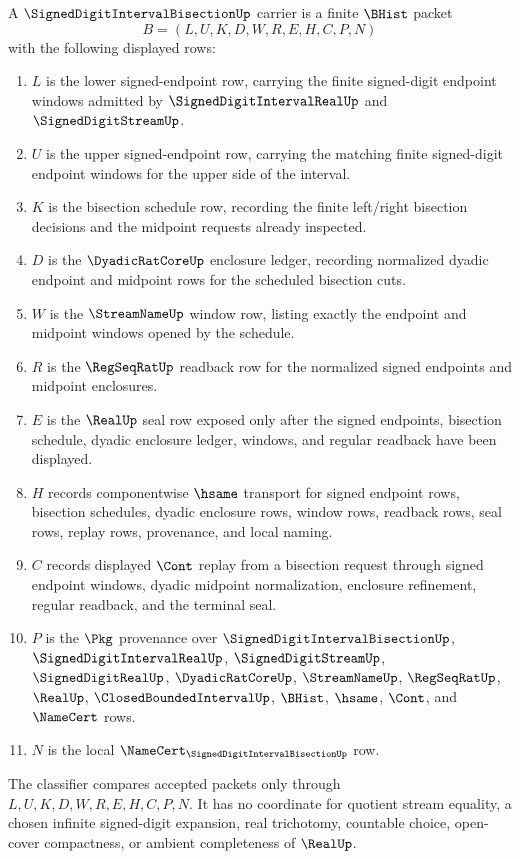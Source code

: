 \begin{definition}
\label{def:signed-digit-interval-bisection-carrier}
A $\SignedDigitIntervalBisectionUp$ carrier is a finite $\BHist$ packet
$$
B=(L,U,K,D,W,R,E,H,C,P,N)
$$
with the following displayed rows:
\begin{enumerate}
\item $L$ is the lower signed-endpoint row, carrying the finite signed-digit endpoint windows admitted by $\SignedDigitIntervalRealUp$ and $\SignedDigitStreamUp$.
\item $U$ is the upper signed-endpoint row, carrying the matching finite signed-digit endpoint windows for the upper side of the interval.
\item $K$ is the bisection schedule row, recording the finite left/right bisection decisions and the midpoint requests already inspected.
\item $D$ is the $\DyadicRatCoreUp$ enclosure ledger, recording normalized dyadic endpoint and midpoint rows for the scheduled bisection cuts.
\item $W$ is the $\StreamNameUp$ window row, listing exactly the endpoint and midpoint windows opened by the schedule.
\item $R$ is the $\RegSeqRatUp$ readback row for the normalized signed endpoints and midpoint enclosures.
\item $E$ is the $\RealUp$ seal row exposed only after the signed endpoints, bisection schedule, dyadic enclosure ledger, windows, and regular readback have been displayed.
\item $H$ records componentwise $\hsame$ transport for signed endpoint rows, bisection schedules, dyadic enclosure rows, window rows, readback rows, seal rows, replay rows, provenance, and local naming.
\item $C$ records displayed $\Cont$ replay from a bisection request through signed endpoint windows, dyadic midpoint normalization, enclosure refinement, regular readback, and the terminal seal.
\item $P$ is the $\Pkg$ provenance over $\SignedDigitIntervalBisectionUp$, $\SignedDigitIntervalRealUp$, $\SignedDigitStreamUp$, $\SignedDigitRealUp$, $\DyadicRatCoreUp$, $\StreamNameUp$, $\RegSeqRatUp$, $\RealUp$, $\ClosedBoundedIntervalUp$, $\BHist$, $\hsame$, $\Cont$, and $\NameCert$ rows.
\item $N$ is the local $\NameCert_{\SignedDigitIntervalBisectionUp}$ row.
\end{enumerate}
The classifier compares accepted packets only through $L,U,K,D,W,R,E,H,C,P,N$. It has no coordinate for quotient stream equality, a chosen infinite signed-digit expansion, real trichotomy, countable choice, open-cover compactness, or ambient completeness of $\RealUp$.
\end{definition}

